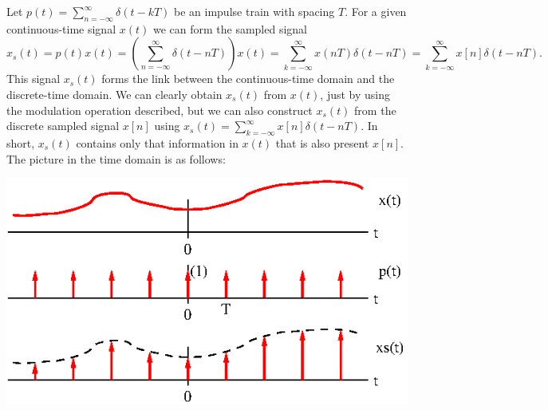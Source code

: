 \documentclass[10pt]{beamer}
\begin{document}
Let $p(t) = \sum_{n=-\infty}^{\infty} \delta(t - k T)$ be an impulse train with spacing $T$.  For a given continuous-time signal $x(t)$ we can form the sampled signal
\begin{equation*}
  x_s(t) = p(t) x(t) = \left( \sum_{n=-\infty}^{\infty} \delta(t - n T) \right) x(t)
  = \sum_{k=-\infty}^{\infty} x(nT) \delta(t - n T) = \sum_{k=-\infty}^{\infty} x[n] \delta(t - n T).
\end{equation*}
This signal $x_s(t)$ forms the link between the continuous-time domain and the discrete-time domain.  We can clearly obtain $x_s(t)$ from $x(t)$, just by using the modulation operation described, but we can also construct $x_s(t)$ from the discrete sampled signal $x[n]$ using $x_s(t) = \sum_{k=-\infty}^{\infty} x[n] \delta(t - n T)$.  In short, $x_s(t)$ contains only that information in $x(t)$ that is also present $x[n]$.  The picture in the time domain is as follows:
\begin{center}
  \includegraphics{sampxtime}
\end{center}
\end{document}
